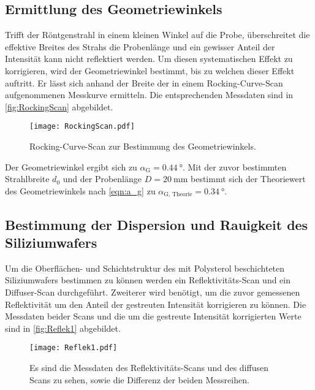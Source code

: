 \subsection{Ermittlung des Geometriewinkels}
Trifft der Röntgenstrahl in einem kleinen Winkel auf die Probe, überschreitet die effektive Breites des Strahs die Probenlänge und ein 
gewisser Anteil der Intensität kann nicht reflektiert werden. Um diesen systematischen Effekt zu korrigieren, wird der Geometriewinkel bestimmt, bis zu welchen dieser 
Effekt auftritt. Er lässt sich anhand der Breite der in einem Rocking-Curve-Scan aufgenommenen Messkurve ermitteln.
Die entsprechenden Messdaten sind in \autoref{fig:RockingScan} abgebildet.
\begin{figure}
  \centering
  \texttt{[image: RockingScan.pdf]}
  \caption{Rocking-Curve-Scan zur Bestimmung des Geometriewinkels.}
  \label{fig:RockingScan}
\end{figure}
Der Geometriewinkel ergibt sich zu $\alpha_\text{G} = \qty{0.44}{\degree}$. Mit der zuvor bestimmten Strahlbreite $d_0$ und der Probenlänge $D = \qty{20}{\milli\metre}$ bestimmt 
sich der Theoriewert des Geometriewinkels nach \autoref{eqn:a_g} zu $\alpha_\text{G, Theorie} = \qty{0.34}{\degree}$.

\subsection{Bestimmung der Dispersion und Rauigkeit des Siliziumwafers}
Um die Oberflächen- und Schichtstruktur des mit Polysterol beschichteten Siliziumwafers bestimmen zu können werden ein Reflektivitäts-Scan und ein Diffuser-Scan durchgeführt.
Zweiterer wird benötigt, um die zuvor gemessenen Reflektivität um den Anteil der gestreuten Intensität korrigieren zu können. Die Messdaten beider Scans und die um die gestreute 
Intensität korrigierten Werte sind in \autoref{fig:Reflek1} abgebildet.
\begin{figure}
  \centering
  \texttt{[image: Reflek1.pdf]}
  \caption{Es sind die Messdaten des Reflektivitäts-Scans und des diffusen Scans zu sehen, sowie die Differenz der beiden Messreihen.}
  \label{fig:Reflek1}
\end{figure}

